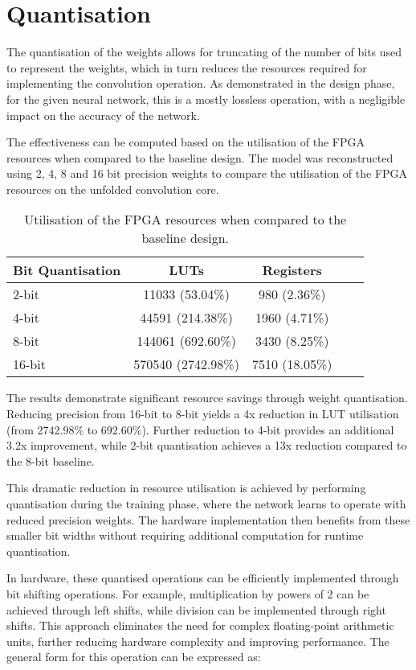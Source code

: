 \section{Quantisation}
The quantisation of the weights allows for truncating of the number of bits used to represent the weights, which in turn reduces the resources required for implementing the convolution operation. As demonstrated in the design phase, for the given neural network, this is a mostly lossless operation, with a negligible impact on the accuracy of the network.

The effectiveness can be computed based on the utilisation of the FPGA resources when compared to the baseline design. The model was reconstructed using 2, 4, 8 and 16 bit precision weights to compare the utilisation of the FPGA resources on the unfolded convolution core.

\begin{table}[h]
    \centering
    \caption{Utilisation of the FPGA resources when compared to the baseline design.}
    \label{tab:quantisation_utilisation}
    \begin{tabular}{lcccc}
        \toprule
        Bit Quantisation & LUTs & Registers \\
        \midrule
        2-bit & 11033 (53.04\%) & 980 (2.36\%) \\
        4-bit & 44591 (214.38\%) & 1960 (4.71\%) \\
        8-bit & 144061 (692.60\%) & 3430 (8.25\%) \\
        16-bit & 570540 (2742.98\%) & 7510 (18.05\%) \\
        \bottomrule
    \end{tabular}
\end{table}

The results demonstrate significant resource savings through weight quantisation. Reducing precision from 16-bit to 8-bit yields a 4x reduction in LUT utilisation (from 2742.98\% to 692.60\%). Further reduction to 4-bit provides an additional 3.2x improvement, while 2-bit quantisation achieves a 13x reduction compared to the 8-bit baseline.

This dramatic reduction in resource utilisation is achieved by performing quantisation during the training phase, where the network learns to operate with reduced precision weights. The hardware implementation then benefits from these smaller bit widths without requiring additional computation for runtime quantisation.

In hardware, these quantised operations can be efficiently implemented through bit shifting operations. For example, multiplication by powers of 2 can be achieved through left shifts, while division can be implemented through right shifts. This approach eliminates the need for complex floating-point arithmetic units, further reducing hardware complexity and improving performance. The general form for this operation can be expressed as:

